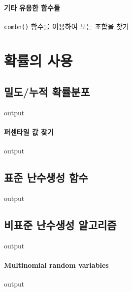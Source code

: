 \paragraph{기타 유용한 함수들}
\texttt{combn()} 함수를 이용하여 모든 조합을 찾기

\section{확률의 사용}

\subsection{밀도/누적 확률분포}
\begin{Schunk}
\begin{Soutput}
output
\end{Soutput}
\end{Schunk}

\paragraph{퍼센타일 값 찾기}
\begin{Schunk}
\begin{Soutput}
output
\end{Soutput}
\end{Schunk}

\subsection{표준 난수생성 함수}
\begin{Schunk}
\begin{Soutput}
output
\end{Soutput}
\end{Schunk}

\subsection{비표준 난수생성 알고리즘}
\begin{Schunk}
\begin{Soutput}
output
\end{Soutput}
\end{Schunk}
\paragraph{Multinomial random variables}
\begin{Schunk}
\begin{Soutput}
output
\end{Soutput}
\end{Schunk}

